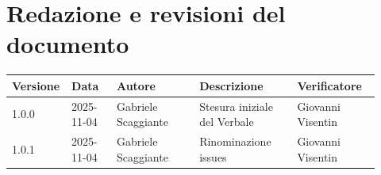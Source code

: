 \documentclass[a4paper,12pt]{article}
\begin{document}
\clearpage
\section{Redazione e revisioni del documento}

\begin{center}
\small
\renewcommand{\arraystretch}{1.2} 
\begin{tabular}{|p{0.1\linewidth}|p{0.12\linewidth}|p{0.22\linewidth}|p{0.26\linewidth}|p{0.22\linewidth}|}
\hline
\rowcolor{gray!60} 
\textbf{Versione} & \textbf{Data} & \textbf{Autore} & \textbf{Descrizione} & \textbf{Verificatore} \\
\hline
\rowcolor{white}
1.0.0 & 2025-11-04 & Gabriele Scaggiante & Stesura iniziale del Verbale & Giovanni Visentin \\
\hline
\rowcolor{gray!20}
1.0.1 & 2025-11-04 & Gabriele Scaggiante & Rinominazione issues & Giovanni Visentin \\
\hline

\end{tabular}
\end{center}
\end{document}
